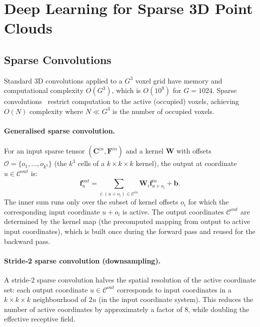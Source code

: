 \section{Deep Learning for Sparse 3D Point Clouds}
\label{sec:deep-learning-3d}

\subsection{Sparse Convolutions}
\label{ssec:sparse-conv}

Standard 3D convolutions applied to a $G^3$ voxel grid have memory and
computational complexity $O(G^3)$, which is $O(10^9)$ for $G = 1024$.
Sparse convolutions~\cite{graham2015sparse,choy2019minkowski} restrict
computation to the active (occupied) voxels, achieving $O(N)$ complexity
where $N \ll G^3$ is the number of occupied voxels.

\paragraph{Generalised sparse convolution.}
For an input sparse tensor $(\mathbf{C}^{in}, \mathbf{F}^{in})$ and a kernel
$\mathbf{W}$ with offsets $\mathcal{O} = \{o_1, \ldots, o_{k^3}\}$
(the $k^3$ cells of a $k\times k\times k$ kernel), the output at coordinate
$u \in \mathcal{C}^{out}$ is:
\begin{equation}
  \mathbf{f}^{out}_u = \sum_{i : (u + o_i) \in \mathcal{C}^{in}}
    \mathbf{W}_i \mathbf{f}^{in}_{u + o_i} + \mathbf{b}.
  \label{eq:sparse-conv}
\end{equation}
The inner sum runs only over the subset of kernel offsets $o_i$ for which
the corresponding input coordinate $u + o_i$ is active.
The output coordinates $\mathcal{C}^{out}$ are determined by the kernel map
(the precomputed mapping from output to active input coordinates), which is
built once during the forward pass and reused for the backward pass.

\paragraph{Stride-2 sparse convolution (downsampling).}
A stride-2 sparse convolution halves the spatial resolution of the active
coordinate set: each output coordinate $u \in \mathcal{C}^{out}$ corresponds
to input coordinates in a $k\times k\times k$ neighbourhood of $2u$
(in the input coordinate system).
This reduces the number of active coordinates by approximately a factor of 8,
while doubling the effective receptive field.

